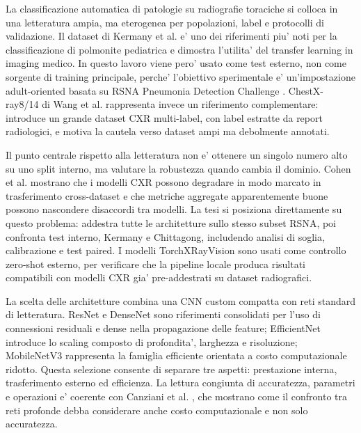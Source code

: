 \documentclass[11pt,a4paper]{article}
\begin{document}
La classificazione automatica di patologie su radiografie toraciche si colloca
in una letteratura ampia, ma eterogenea per popolazioni, label e protocolli di
validazione. Il dataset di Kermany et al. \cite{kermany2018} e' uno dei
riferimenti piu' noti per la classificazione di polmonite pediatrica e dimostra
l'utilita' del transfer learning in imaging medico. In questo lavoro viene pero'
usato come test esterno, non come sorgente di training principale, perche'
l'obiettivo sperimentale e' un'impostazione adult-oriented basata su RSNA
Pneumonia Detection Challenge \cite{rsna_kaggle}. ChestX-ray8/14 di Wang et al.
\cite{wang2017nih} rappresenta invece un riferimento complementare: introduce
un grande dataset CXR multi-label, con label estratte da report radiologici, e
motiva la cautela verso dataset ampi ma debolmente annotati.

Il punto centrale rispetto alla letteratura non e' ottenere un singolo numero
alto su uno split interno, ma valutare la robustezza quando cambia il dominio.
Cohen et al. \cite{cohen2020limits} mostrano che i modelli CXR possono
degradare in modo marcato in trasferimento cross-dataset e che metriche
aggregate apparentemente buone possono nascondere disaccordi tra modelli. La
tesi si posiziona direttamente su questo problema: addestra tutte le
architetture sullo stesso subset RSNA, poi confronta test interno, Kermany e
Chittagong, includendo analisi di soglia, calibrazione e test paired. I modelli
TorchXRayVision \cite{torchxrayvision} sono usati come controllo zero-shot
esterno, per verificare che la pipeline locale produca risultati compatibili con
modelli CXR gia' pre-addestrati su dataset radiografici.

La scelta delle architetture combina una CNN custom compatta con reti standard
di letteratura. ResNet \cite{he2016resnet} e DenseNet \cite{huang2017densenet}
sono riferimenti consolidati per l'uso di connessioni residuali e dense nella
propagazione delle feature; EfficientNet \cite{tan2019efficientnet} introduce
lo scaling composto di profondita', larghezza e risoluzione; MobileNetV3
\cite{howard2019mobilenetv3} rappresenta la famiglia efficiente orientata a
costo computazionale ridotto. Questa selezione consente di separare tre aspetti:
prestazione interna, trasferimento esterno ed efficienza. La lettura congiunta
di accuratezza, parametri e operazioni e' coerente con Canziani et al.
\cite{canziani2016analysis}, che mostrano come il confronto tra reti profonde
debba considerare anche costo computazionale e non solo accuratezza.
\end{document}
